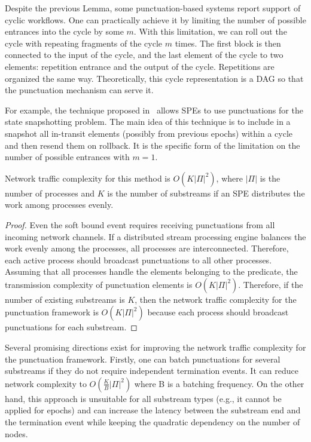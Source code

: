 Despite the previous Lemma, some punctuation-based systems report support of cyclic workflows. One can practically achieve it by limiting the number of possible entrances into the cycle by some $m$. With this limitation, we can roll out the cycle with repeating fragments of the cycle $m$ times. The first block is then connected to the input of the cycle, and the last element of the cycle to two elements: repetition entrance and the output of the cycle. Repetitions are organized the same way. Theoretically, this cycle representation is a DAG so that the punctuation mechanism can serve it.

For example, the technique proposed in~\cite{Carbone:2017:SMA:3137765.3137777} allows SPEs to use punctuations for the state snapshotting problem. The main idea of this technique is to include in a snapshot all in-transit elements (possibly from previous epochs) within a cycle and then resend them on rollback. It is the specific form of the limitation on the number of possible entrances with $m=1$.

\begin{lemma}
Network traffic complexity for this method is $O(K|\Pi|^2)$, where $|\Pi|$ is the number of processes and $K$ is the number of substreams if an SPE distributes the work among processes evenly.
\end{lemma}
\begin{proof}

Even the soft bound event requires receiving punctuations from all incoming network channels. If a distributed stream processing engine balances the work evenly among the processes, all processes are interconnected. Therefore, each active process should broadcast punctuations to all other processes. Assuming that all processes handle the elements belonging to the predicate, the transmission complexity of punctuation elements is $O(K|\Pi|^2)$. Therefore, if the number of existing substreams is $K$, then the network traffic complexity for the punctuation framework is $O(K|\Pi|^2)$ because each process should broadcast punctuations for each substream. 

\end{proof}

Several promising directions exist for improving the network traffic complexity for the punctuation framework. Firstly, one can batch punctuations for several substreams if they do not require independent termination events. It can reduce network complexity to $O(\frac{K}{B}|\Pi|^2)$ where B is a batching frequency. On the other hand, this approach is unsuitable for all substream types (e.g., it cannot be applied for epochs) and can increase the latency between the substream end and the termination event while keeping the quadratic dependency on the number of nodes.

